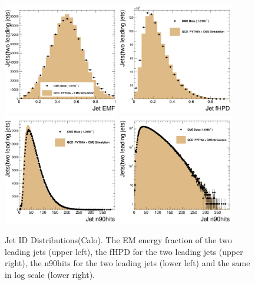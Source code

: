\begin{figure}[!ht]
  \begin{center}
    \includegraphics[width=0.45\textwidth]{Figures/c_EMF.pdf}
    \includegraphics[width=0.45\textwidth]{Figures/c_fHPD.pdf}
    \includegraphics[width=0.45\textwidth]{Figures/c_n90hits.pdf}
    \includegraphics[width=0.45\textwidth]{Figures/c_n90hits_log.pdf}

    \caption{Jet ID Distributions(Calo).  The EM
      energy fraction of the two leading jets (upper left), the fHPD for the two
      leading jets (upper right), the n90hits for the two leading jets
      (lower left) and the same in log scale
      (lower right). }
    \label{jet_id_calo}
  \end{center}
\end{figure}

